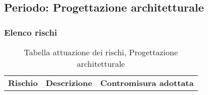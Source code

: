 \subsection{Periodo: Progettazione architetturale}
\subsubsection{Elenco rischi}
\begin{table}[h]
\caption{Tabella attuazione dei rischi, Progettazione architetturale}
\begin{center}
\begin{tabular}{p{2cm}p{6cm}p{6cm}}
\textbf{Rischio} & \textbf{Descrizione}                                                                                                        & \textbf{Contromisura adottata}                                                                                                                                                   \\

\end{tabular}
\end{center}
\end{table}